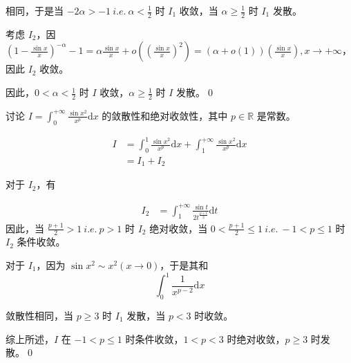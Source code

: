 相同，于是当 $\displaystyle -2\alpha  >-1\ i.e.\ \alpha < \frac{1}{2}$ 时 $\displaystyle I_{1}$ 收敛，当 $\displaystyle \alpha \geqslant \frac{1}{2}$ 时 $\displaystyle I_{1}$ 发散。

考虑 $\displaystyle I_{2}$，因 $\displaystyle \left( 1-\frac{\sin x}{x}\right)^{-\alpha } -1=\alpha \frac{\sin x}{x} +o\left(\left(\frac{\sin x}{x}\right)^{2}\right) =( \alpha +o( 1))\left(\frac{\sin x}{x}\right) ,x\rightarrow +\infty $，因此 $\displaystyle I_{2}$ 收敛。

因此，$\displaystyle 0< \alpha < \frac{1}{2}$ 时 $\displaystyle I$ 收敛，$\displaystyle \alpha \geqslant \frac{1}{2}$ 时 $\displaystyle I$ 发散。\qed 



\begin{ques}
	讨论 $\displaystyle I=\int _{0}^{+\infty }\frac{\sin x^{2}}{x^{p}}\mathrm{d} x$ 的敛散性和绝对收敛性，其中 $\displaystyle p\in \mathbb{R}$ 是常数。
\end{ques}

\begin{align*}
	I & =\int _{0}^{1}\frac{\sin x^{2}}{x^{p}}\mathrm{d} x+\int _{1}^{+\infty }\frac{\sin x^{2}}{x^{p}}\mathrm{d} x\\
	& =I_{1} +I_{2}
\end{align*}


对于 $\displaystyle I_{2}$，有


\begin{align*}
	I_{2} & =\int _{1}^{+\infty }\frac{\sin t}{2t^{\frac{p+1}{2}}}\mathrm{d} t
\end{align*}
因此，当 $\displaystyle \frac{p+1}{2}  >1\ i.e.\ p >1$ 时 $\displaystyle I_{2}$ 绝对收敛，当 $\displaystyle 0< \frac{p+1}{2} \leqslant 1\ i.e.\ -1< p\leqslant 1$ 时 $\displaystyle I_{2}$ 条件收敛。

对于 $\displaystyle I_{1}$，因为 $\displaystyle \sin x^{2} \sim x^{2}\left( x\rightarrow 0\right)$，于是其和 
\begin{equation*}
	\int _{0}^{1}\frac{1}{x^{p-2}}\mathrm{d} x
\end{equation*}


敛散性相同，当 $\displaystyle p\geqslant 3$ 时 $\displaystyle I_{1}$ 发散，当 $\displaystyle p< 3$ 时收敛。

综上所述，$\displaystyle I$ 在 $\displaystyle -1< p\leqslant 1$ 时条件收敛，$\displaystyle 1< p< 3$ 时绝对收敛，$\displaystyle p\geqslant 3$ 时发散。\qed 





